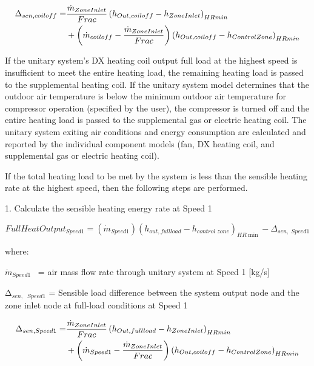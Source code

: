 \begin{equation}
  \begin{split}
    \Delta_{sen,coil off} =& \frac{\dot{m}_{ZoneInlet}}{Frac} \PB{h_{Out,coil off} - h_{ZoneInlet}}_{HRmin} \\
                              &+ \PB{\dot{m}_{coil off} - \frac{\dot{m}_{ZoneInlet}}{Frac}} \PB{h_{Out,coil off} - h_{ControlZone}}_{HRmin}
  \end{split}
\end{equation}

If the unitary system's DX heating coil output full load at the highest speed is insufficient to meet the entire heating load, the remaining heating load is passed to the supplemental heating coil. If the unitary system model determines that the outdoor air temperature is below the minimum outdoor air temperature for compressor operation (specified by the user), the compressor is turned off and the entire heating load is passed to the supplemental gas or electric heating coil. The unitary system exiting air conditions and energy consumption are calculated and reported by the individual component models (fan, DX heating coil, and supplemental gas or electric heating coil).

If the total heating load to be met by the system is less than the sensible heating rate at the highest speed, then the following steps are performed.

1. Calculate the sensible heating energy rate at Speed 1

\begin{equation}
FullHeatOutpu{t_{Speed1}} = ({\dot m_{Speed1}}){({h_{out,fullload}} - {h_{control\;zone}})_{HR\min }} - {\Delta_{sen,\;Speed1}}
\end{equation}

where:

\emph{\({\dot m_{Speed1}}\)}~ = air mass flow rate through unitary system at Speed 1 {[}kg/s{]}

Δ\emph{\(_{sen,}\) \(_{Speed1}\)} = Sensible load difference between the system output node and the zone inlet node at full-load conditions at Speed 1

\begin{equation}
  \begin{split}
    \Delta_{sen,Speed1} =& \frac{\dot{m}_{ZoneInlet}}{Frac} \PB{h_{Out,full load} - h_{ZoneInlet}}_{HRmin} \\
                              &+ \PB{\dot{m}_{Speed1} - \frac{\dot{m}_{ZoneInlet}}{Frac}} \PB{h_{Out,coil off} - h_{ControlZone}}_{HRmin}
  \end{split}
\end{equation}

